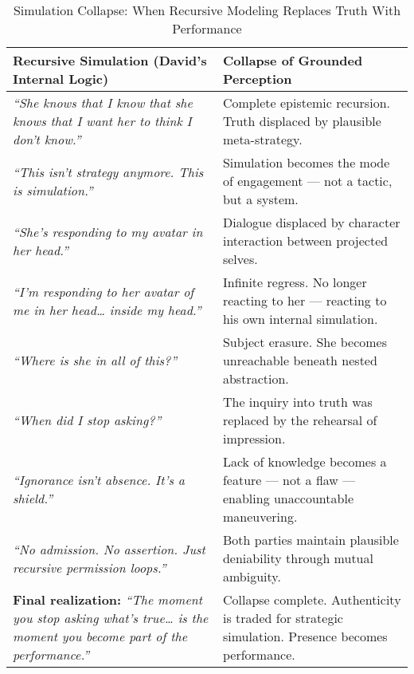 \medskip

\begin{table}[H]
  \centering
  \renewcommand{\arraystretch}{1.6}
  \begin{tabular}{>{\raggedright\arraybackslash}p{7cm} 
                  >{\raggedright\arraybackslash}p{7cm}}
  \toprule
  \textbf{Recursive Simulation (David’s Internal Logic)} 
  & \textbf{Collapse of Grounded Perception} \\
  \midrule

  \textit{“She knows that I know that she knows that I want her to think I don’t know.”} 
  & Complete epistemic recursion. Truth displaced by plausible meta-strategy. \\

  \textit{“This isn’t strategy anymore. This is simulation.”} 
  & Simulation becomes the mode of engagement — not a tactic, but a system. \\

  \textit{“She’s responding to my avatar in her head.”} 
  & Dialogue displaced by character interaction between projected selves. \\

  \textit{“I’m responding to her avatar of me in her head… inside my head.”} 
  & Infinite regress. No longer reacting to her — reacting to his own internal simulation. \\

  \textit{“Where is she in all of this?”} 
  & Subject erasure. She becomes unreachable beneath nested abstraction. \\

  \textit{“When did I stop asking?”} 
  & The inquiry into truth was replaced by the rehearsal of impression. \\

  \textit{“Ignorance isn’t absence. It’s a shield.”} 
  & Lack of knowledge becomes a feature — not a flaw — enabling unaccountable maneuvering. \\

  \textit{“No admission. No assertion. Just recursive permission loops.”} 
  & Both parties maintain plausible deniability through mutual ambiguity. \\

  \textbf{Final realization:} \textit{“The moment you stop asking what’s true… is the moment you become part of the performance.”} 
  & Collapse complete. Authenticity is traded for strategic simulation. Presence becomes performance. \\

  \bottomrule
  \end{tabular}
  \caption{Simulation Collapse: When Recursive Modeling Replaces Truth With Performance}
\end{table}


